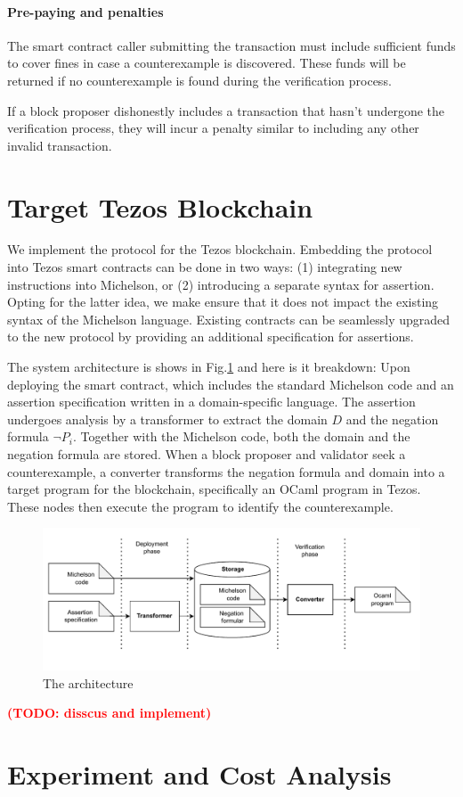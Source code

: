 \documentclass[runningheads]{llncs}
\newcommand{\todo}[1]{\textbf{\textcolor{red}{(TODO: #1)}}}
\begin{document}
\paragraph{Pre-paying and penalties} The smart contract caller submitting the transaction must include sufficient funds to cover fines in case a counterexample is discovered. These funds will be returned if no counterexample is found during the verification process.

If a block proposer dishonestly includes a transaction that hasn't undergone the verification process, they will incur a penalty similar to including any other invalid transaction.

\section{Target Tezos Blockchain}
\label{sec:tezos}
We implement the protocol for the Tezos blockchain. Embedding the protocol into Tezos smart contracts can be done in two ways: (1) integrating new instructions into Michelson, or (2) introducing a separate syntax for assertion. Opting for the latter idea, we make ensure that it does not impact the existing syntax of the Michelson language. Existing contracts can be seamlessly upgraded to the new protocol by providing an additional specification for assertions.

The system architecture is shows in Fig.\ref{fig.architect} and here is it breakdown: Upon deploying the smart contract, which includes the standard Michelson code and an assertion specification written in a domain-specific language. The assertion undergoes analysis by a transformer to extract the domain $D$ and the negation formula $\neg P_i$. Together with the Michelson code, both the domain and the negation formula are stored. When a block proposer and validator seek a counterexample, a converter transforms the negation formula and domain into a target program for the blockchain, specifically an OCaml program in Tezos. These nodes then execute the program to identify the counterexample.

\begin{figure}
\centering
\includegraphics[scale=0.65]{assertion-tezos}
\caption{The architecture}
\label{fig.architect}
\end{figure}
\todo{disscus and implement}
\section{Experiment and Cost Analysis}
\label{sec:cost-analysis}
\end{document}
